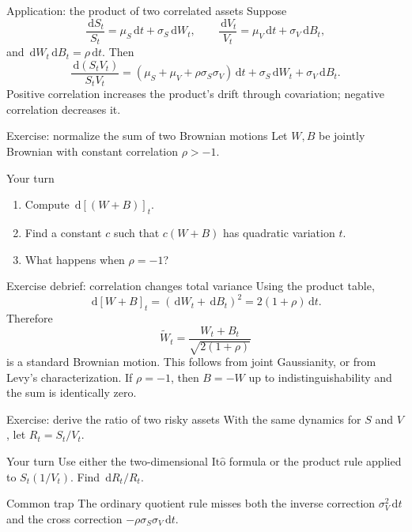 \documentclass[handout,10pt,aspectratio=169]{beamer}
\newcommand{\dd}{\,\mathrm d}
\newcommand{\Ito}{\mathrm{It\hat{o}}}
\begin{document}
\begin{frame}{Application: the product of two correlated assets}
Suppose
\[
\frac{\dd S_t}{S_t}=\mu_S\dd t+\sigma_S\dd W_t,
\qquad
\frac{\dd V_t}{V_t}=\mu_V\dd t+\sigma_V\dd B_t,
\]
and \(\dd W_t\dd B_t=\rho\dd t\). Then
\[
\boxed{
\frac{\dd(S_tV_t)}{S_tV_t}
=\left(\mu_S+\mu_V+\rho\sigma_S\sigma_V\right)\dd t
+\sigma_S\dd W_t+\sigma_V\dd B_t.}
\]
Positive correlation increases the product's drift through covariation; negative correlation decreases it.
\end{frame}

\begin{frame}{Exercise: normalize the sum of two Brownian motions}
Let \(W,B\) be jointly Brownian with constant correlation \(\rho>-1\).
\begin{block}{Your turn}
\begin{enumerate}
\item Compute \(\dd[(W+B)]_t\).
\item Find a constant \(c\) such that \(c(W+B)\) has quadratic variation \(t\).
\item What happens when \(\rho=-1\)?
\end{enumerate}
\end{block}
\end{frame}

\begin{frame}{Exercise debrief: correlation changes total variance}
Using the product table,
\[
\dd[W+B]_t
=(\dd W_t+\dd B_t)^2
=2(1+\rho)\dd t.
\]
Therefore
\[
\boxed{\widetilde W_t=\frac{W_t+B_t}{\sqrt{2(1+\rho)}}}
\]
is a standard Brownian motion. This follows from joint Gaussianity, or from Levy's characterization.
If \(\rho=-1\), then \(B=-W\) up to indistinguishability and the sum is identically zero.
\end{frame}

\begin{frame}{Exercise: derive the ratio of two risky assets}
With the same dynamics for \(S\) and \(V\), let \(R_t=S_t/V_t\).
\begin{block}{Your turn}
Use either the two-dimensional \(\Ito\) formula or the product rule applied to \(S_t(1/V_t)\). Find \(\dd R_t/R_t\).
\end{block}
\begin{alertblock}{Common trap}
The ordinary quotient rule misses both the inverse correction \(\sigma_V^2\dd t\) and the cross correction \(-\rho\sigma_S\sigma_V\dd t\).
\end{alertblock}
\end{frame}
\end{document}
